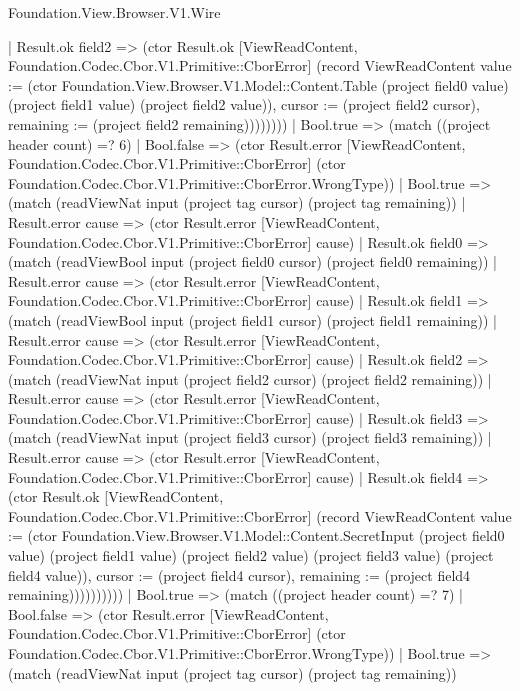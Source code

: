 \begin{lexlean}{Foundation.View.Browser.V1.Wire}
\begin{semanticmodule}
{                      | Result.ok field2 => (ctor Result.ok [ViewReadContent, Foundation.Codec.Cbor.V1.Primitive::CborError] (record ViewReadContent {value := (ctor Foundation.View.Browser.V1.Model::Content.Table (project field0 value) (project field1 value) (project field2 value)), cursor := (project field2 cursor), remaining := (project field2 remaining)})))))))
            | Bool.true => (match ((project header count) =? 6)
              | Bool.false => (ctor Result.error [ViewReadContent, Foundation.Codec.Cbor.V1.Primitive::CborError] (ctor Foundation.Codec.Cbor.V1.Primitive::CborError.WrongType))
              | Bool.true => (match (readViewNat input (project tag cursor) (project tag remaining))
                | Result.error cause => (ctor Result.error [ViewReadContent, Foundation.Codec.Cbor.V1.Primitive::CborError] cause)
                | Result.ok field0 => (match (readViewBool input (project field0 cursor) (project field0 remaining))
                  | Result.error cause => (ctor Result.error [ViewReadContent, Foundation.Codec.Cbor.V1.Primitive::CborError] cause)
                  | Result.ok field1 => (match (readViewBool input (project field1 cursor) (project field1 remaining))
                    | Result.error cause => (ctor Result.error [ViewReadContent, Foundation.Codec.Cbor.V1.Primitive::CborError] cause)
                    | Result.ok field2 => (match (readViewNat input (project field2 cursor) (project field2 remaining))
                      | Result.error cause => (ctor Result.error [ViewReadContent, Foundation.Codec.Cbor.V1.Primitive::CborError] cause)
                      | Result.ok field3 => (match (readViewNat input (project field3 cursor) (project field3 remaining))
                        | Result.error cause => (ctor Result.error [ViewReadContent, Foundation.Codec.Cbor.V1.Primitive::CborError] cause)
                        | Result.ok field4 => (ctor Result.ok [ViewReadContent, Foundation.Codec.Cbor.V1.Primitive::CborError] (record ViewReadContent {value := (ctor Foundation.View.Browser.V1.Model::Content.SecretInput (project field0 value) (project field1 value) (project field2 value) (project field3 value) (project field4 value)), cursor := (project field4 cursor), remaining := (project field4 remaining)})))))))))
          | Bool.true => (match ((project header count) =? 7)
            | Bool.false => (ctor Result.error [ViewReadContent, Foundation.Codec.Cbor.V1.Primitive::CborError] (ctor Foundation.Codec.Cbor.V1.Primitive::CborError.WrongType))
            | Bool.true => (match (readViewNat input (project tag cursor) (project tag remaining))
}
\end{semanticmodule}
\end{lexlean}
